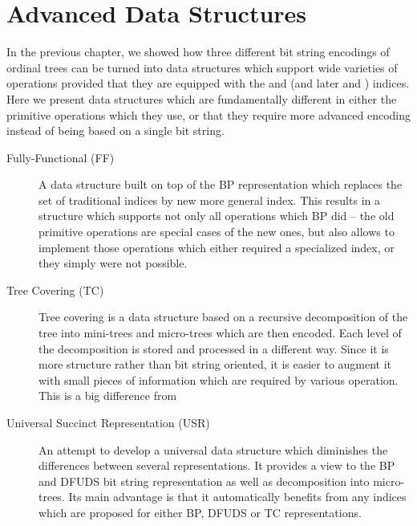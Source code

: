 \chapter{Advanced Data Structures}

In the previous chapter, we showed how three different bit string encodings of ordinal trees can be turned into data structures which support wide varieties of operations provided that they are equipped with the \rank{} and \select{} (and later \match{} and \enclose{}) indices.
Here we present data structures which are fundamentally different in either the primitive operations which they use, or that they require more advanced encoding instead of being based on a single bit string.

\begin{description}
	\item[Fully-Functional (FF)] 
	A data structure built on top of the BP representation which replaces the set of traditional indices by new more general index.
	This results in a structure which supports not only all operations which BP did -- the old primitive operations are special cases of the new ones, but also allows to implement those operations which either required a specialized index, or they simply were not possible.
	
	\item[Tree Covering (TC)]
	Tree covering is a data structure based on a recursive decomposition of the tree into mini-trees and micro-trees which are then encoded.
	Each level of the decomposition is stored and processed in a different way.
	Since it is more structure rather than bit string oriented, it is easier to augment it with small pieces of information which are required by various operation.
	This is a big difference from
	\item[Universal Succinct Representation (USR)]
	An attempt to develop a universal data structure which diminishes the differences between several representations.
	It provides a view to the BP and DFUDS bit string representation as well as decomposition into micro-trees.
	Its main advantage is that it automatically benefits from any indices which are proposed for either BP, DFUDS or TC representations.
\end{description}

